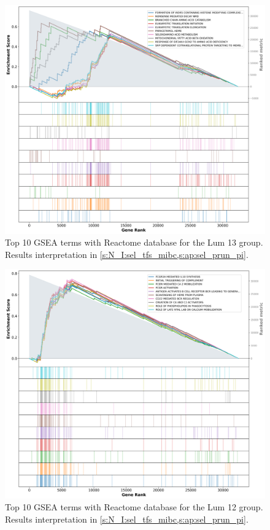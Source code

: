 \begin{figure}[!htb]
    \centering
    \includegraphics[width=\textwidth,keepaspectratio]{Sections/Network_I/Resources/selective_pruning/gsea/largeLuminal_10_top_manTerms.png}
    \caption{Top 10 GSEA terms with Reactome database for the Lum 13 group. Results interpretation in \cref{s:N_I:sel_tfs_mibc,s:ap:sel_prun_pi}.}
    \label{fig:ap:gsea_largeLuminal}
\end{figure}

\begin{figure}[!htb]
    \centering
    \includegraphics[width=\textwidth,keepaspectratio]{Sections/Network_I/Resources/selective_pruning/gsea/lumInf_10_top_manTerms.png}
    \caption{Top 10 GSEA terms with Reactome database for the Lum 12 group. Results interpretation in \cref{s:N_I:sel_tfs_mibc,s:ap:sel_prun_pi}.}
    \label{fig:ap:gsea_lumInf}
\end{figure}


